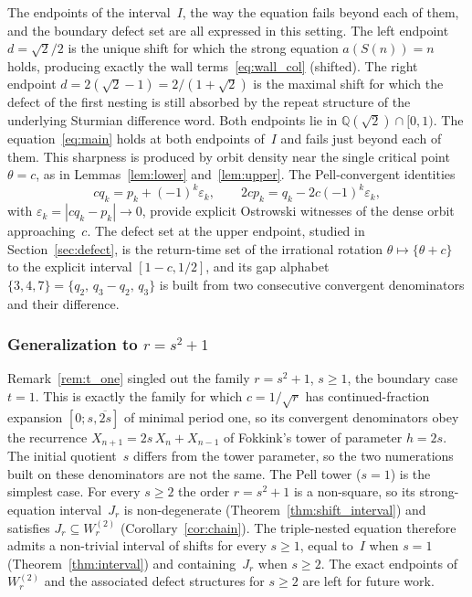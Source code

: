 \documentclass{birkjour}
\theoremstyle{definition}
\theoremstyle{remark}
\newcommand{\frc}[1]{\{ #1 \}}
\begin{document}
The endpoints of the interval~$I$, the way the
equation fails beyond each of them, and the boundary
defect set are all expressed in this setting. The left endpoint
$d=\sqrt{2}/2$ is the unique shift for which the
strong equation $a(S(n))=n$ holds, producing
exactly the wall terms~\eqref{eq:wall_col}
(shifted). The right endpoint
$d=2(\sqrt{2}-1)=2/(1+\sqrt{2})$ is the maximal
shift for which the defect of the
first nesting is still absorbed by the repeat
structure of the underlying Sturmian difference
word. Both endpoints lie in
$\mathbb{Q}(\sqrt{2})\cap[0,1)$.
The equation~\eqref{eq:main} holds at both endpoints of~$I$
and fails just beyond each of them. This sharpness is
produced by orbit density near the single critical point
$\theta=c$, as in Lemmas~\ref{lem:lower}
and~\ref{lem:upper}.
The Pell-convergent identities
\[
  cq_{k}=p_{k}+(-1)^{k}\varepsilon_{k},\qquad
  2cp_{k}=q_{k}-2c(-1)^{k}\varepsilon_{k},
\]
with $\varepsilon_{k}=|cq_{k}-p_{k}|\to 0$, provide
explicit Ostrowski witnesses of the dense orbit
approaching~$c$.
The defect set at the upper endpoint, studied in
Section~\ref{sec:defect}, is the return-time set
of the irrational rotation
$\theta\mapsto\frc{\theta+c}$ to the explicit
interval $[1-c,1/2]$, and its gap alphabet
$\{3,4,7\}=\{q_{2},\,q_{3}-q_{2},\,q_{3}\}$ is built from two
consecutive convergent denominators and their difference.

\subsubsection*{Generalization to \texorpdfstring{$r=s^{2}+1$}{r=s\textasciicircum 2+1}}

Remark~\ref{rem:t_one} singled out the family
$r=s^{2}+1$, $s\ge 1$, the boundary case $t=1$. This is
exactly the family for which
$c=1/\!\sqrt{r}$ has continued-fraction expansion
$[0;s,\overline{2s}]$ of minimal period one, so its
convergent denominators obey the recurrence
$X_{n+1}=2s\,X_{n}+X_{n-1}$ of Fokkink's tower of parameter
$h=2s$. The initial quotient~$s$ differs from the tower
parameter, so the two numerations built on these
denominators are not the same. The Pell tower
($s=1$) is the simplest case. For every $s\ge 2$ the order
$r=s^{2}+1$ is a non-square, so its strong-equation
interval~$J_{r}$ is non-degenerate
(Theorem~\ref{thm:shift_interval}) and satisfies
$J_{r}\subseteq W_{r}^{(2)}$ (Corollary~\ref{cor:chain}). The
triple-nested equation therefore admits a non-trivial interval
of shifts for every $s\ge 1$, equal to~$I$ when $s=1$
(Theorem~\ref{thm:interval}) and containing~$J_{r}$ when
$s\ge 2$. The exact endpoints of $W_{r}^{(2)}$ and the
associated defect structures for $s\ge 2$ are left for future
work.
\end{document}

